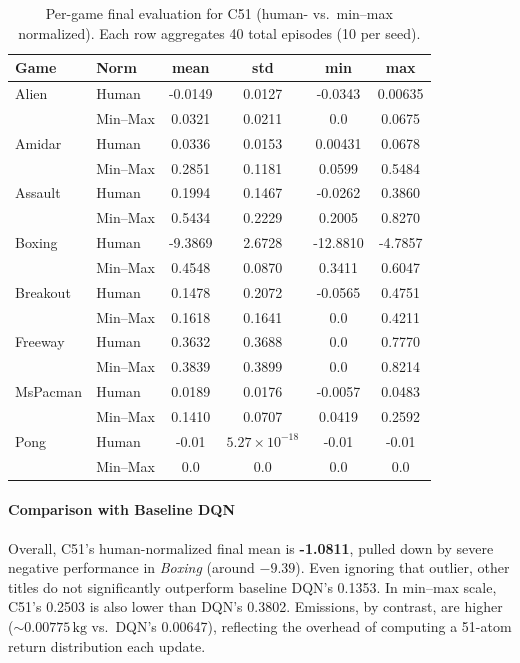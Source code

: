 \begin{table}
	\caption{Per-game final evaluation for C51 (human- vs.\ min--max normalized). 
		Each row aggregates 40 total episodes (10 per seed).}
	\label{tab:c51_eval_gamewise}
	\centering
	\begin{tabular}{llcccc}
		\toprule
		\textbf{Game} & \textbf{Norm} & \textbf{mean} & \textbf{std} & \textbf{min} & \textbf{max}\\
		\midrule
		Alien & Human    & -0.0149 & 0.0127 & -0.0343 & 0.00635 \\
		& Min--Max & 0.0321  & 0.0211 & 0.0     & 0.0675 \\
		\cmidrule{1-6}
		Amidar & Human   & 0.0336  & 0.0153 & 0.00431 & 0.0678 \\
		& Min--Max & 0.2851 & 0.1181 & 0.0599  & 0.5484 \\
		\cmidrule{1-6}
		Assault & Human  & 0.1994  & 0.1467 & -0.0262 & 0.3860 \\
		& Min--Max & 0.5434 & 0.2229 & 0.2005  & 0.8270 \\
		\cmidrule{1-6}
		Boxing & Human   & -9.3869 & 2.6728 & -12.8810 & -4.7857 \\
		& Min--Max & 0.4548  & 0.0870 & 0.3411   & 0.6047 \\
		\cmidrule{1-6}
		Breakout & Human & 0.1478  & 0.2072 & -0.0565 & 0.4751 \\
		& Min--Max & 0.1618 & 0.1641 & 0.0     & 0.4211 \\
		\cmidrule{1-6}
		Freeway & Human  & 0.3632  & 0.3688 & 0.0      & 0.7770 \\
		& Min--Max & 0.3839 & 0.3899 & 0.0     & 0.8214 \\
		\cmidrule{1-6}
		MsPacman & Human & 0.0189  & 0.0176 & -0.0057 & 0.0483 \\
		& Min--Max & 0.1410 & 0.0707 & 0.0419 & 0.2592 \\
		\cmidrule{1-6}
		Pong & Human     & -0.01   & $5.27\times 10^{-18}$ & -0.01 & -0.01 \\
		& Min--Max & 0.0     & 0.0     & 0.0     & 0.0 \\
		\bottomrule
	\end{tabular}
\end{table}

\paragraph{Comparison with Baseline DQN}
Overall, C51’s human-normalized final mean is \textbf{-1.0811}, pulled down by severe negative performance in \emph{Boxing} (around $-9.39$). Even ignoring that outlier, other titles do not significantly outperform baseline DQN’s 0.1353. In min--max scale, C51’s 0.2503 is also lower than DQN’s 0.3802. Emissions, by contrast, are higher ($\sim0.00775\,\mathrm{kg}$ vs.\ DQN’s 0.00647), reflecting the overhead of computing a 51-atom return distribution each update.

